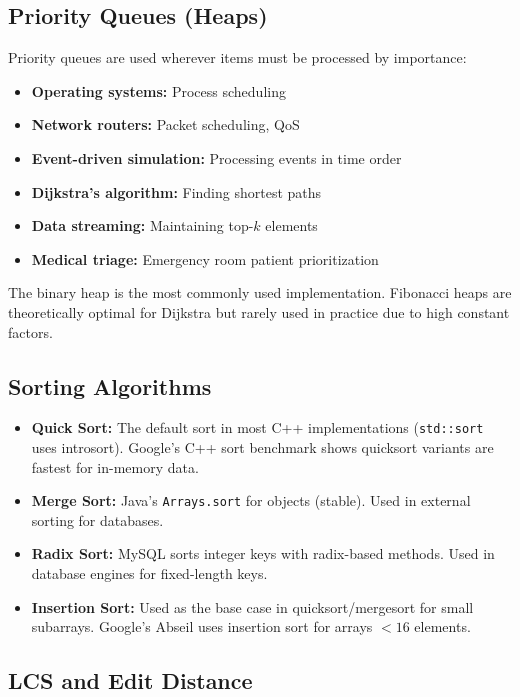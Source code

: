 \subsection{Priority Queues (Heaps)}

Priority queues are used wherever items must be processed by importance:
\begin{itemize}
    \item \textbf{Operating systems:} Process scheduling
    \item \textbf{Network routers:} Packet scheduling, QoS
    \item \textbf{Event-driven simulation:} Processing events in time order
    \item \textbf{Dijkstra's algorithm:} Finding shortest paths
    \item \textbf{Data streaming:} Maintaining top-$k$ elements
    \item \textbf{Medical triage:} Emergency room patient prioritization
\end{itemize}

The binary heap is the most commonly used implementation. Fibonacci heaps are theoretically optimal for Dijkstra but rarely used in practice due to high constant factors.

\subsection{Sorting Algorithms}

\begin{itemize}
    \item \textbf{Quick Sort:} The default sort in most C++ implementations (\texttt{std::sort} uses introsort). Google's C++ sort benchmark shows quicksort variants are fastest for in-memory data.
    \item \textbf{Merge Sort:} Java's \texttt{Arrays.sort} for objects (stable). Used in external sorting for databases.
    \item \textbf{Radix Sort:} MySQL sorts integer keys with radix-based methods. Used in database engines for fixed-length keys.
    \item \textbf{Insertion Sort:} Used as the base case in quicksort/mergesort for small subarrays. Google's Abseil uses insertion sort for arrays $< 16$ elements.
\end{itemize}

\subsection{LCS and Edit Distance}

